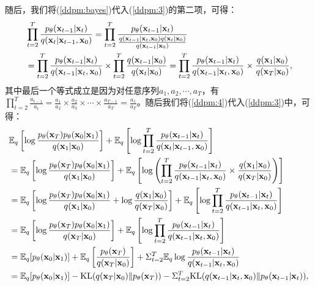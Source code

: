 \documentclass[11pt,a4paper,UTF8]{ctexart}
\begin{document}
\begin{appendices}
随后，我们将(\ref{ddpm:bayes})代入(\ref{ddpm:3})的第二项，可得：
\begin{align}
\begin{split}
    &\prod_{t=2}^T \frac{p_{\theta}(\mathbf{x}_{t-1}|\mathbf{x}_t)}{q(\mathbf{x}_t|\mathbf{x}_{t-1},\mathbf{x}_0)} = \prod_{t=2}^T \frac{p_{\theta}(\mathbf{x}_{t-1}|\mathbf{x}_t)}{\frac{q(\mathbf{x}_{t-1}|\mathbf{x}_t,\mathbf{x}_0)q(\mathbf{x}_t|\mathbf{x}_0)}{q(\mathbf{x}_{t-1}|\mathbf{x}_0)}} \\
    &= \prod_{t=2}^T \frac{p_{\theta}(\mathbf{x}_{t-1}|\mathbf{x}_t)}{q(\mathbf{x}_{t-1}|\mathbf{x}_t,\mathbf{x}_0)}  \times \prod_{t=2}^T \frac{q(\mathbf{x}_{t-1}|\mathbf{x}_0)}{q(\mathbf{x}_t|\mathbf{x}_0)} = \prod_{t=2}^T \frac{p_{\theta}(\mathbf{x}_{t-1}|\mathbf{x}_t)}{q(\mathbf{x}_{t-1}|\mathbf{x}_t,\mathbf{x}_0)}  \times \frac{q(\mathbf{x}_1|\mathbf{x}_0)}{q(\mathbf{x}_T|\mathbf{x}_0)},
\end{split}
\label{ddpm:4}
\end{align}
其中最后一个等式成立是因为对任意序列$a_1,a_2,\cdots,a_T$，有$\prod_{t=2}^T\frac{a_{t-1}}{a_t}=\frac{a_1}{a_2}\times\frac{a_2}{a_3}\times\cdots\times\frac{a_{T-1}}{a_T}=\frac{a_1}{a_T}$。随后我们将(\ref{ddpm:4})代入(\ref{ddpm:3})中，可得：
\begin{align}
\begin{split}
    & \mathbb{E}_q \left[\log\frac{p_{\theta}(\mathbf{x}_T)p_{\theta}(\mathbf{x}_0|\mathbf{x}_1)}{q(\mathbf{x}_1|\mathbf{x}_0)} \right] + \mathbb{E}_q \left[\log \prod_{t=2}^T \frac{p_{\theta}(\mathbf{x}_{t-1}|\mathbf{x}_t)}{q(\mathbf{x}_t|\mathbf{x}_{t-1},\mathbf{x}_0)} \right] \\
    &= \mathbb{E}_q \left[\log\frac{p_{\theta}(\mathbf{x}_T)p_{\theta}(\mathbf{x}_0|\mathbf{x}_1)}{q(\mathbf{x}_1|\mathbf{x}_0)} \right] + \mathbb{E}_q \left[\log \left(\prod_{t=2}^T \frac{p_{\theta}(\mathbf{x}_{t-1}|\mathbf{x}_t)}{q(\mathbf{x}_{t-1}|\mathbf{x}_t,\mathbf{x}_0)}  \times \frac{q(\mathbf{x}_1|\mathbf{x}_0)}{q(\mathbf{x}_T|\mathbf{x}_0)}\right) \right] \\
    &=\mathbb{E}_q \left[\log\frac{p_{\theta}(\mathbf{x}_T)p_{\theta}(\mathbf{x}_0|\mathbf{x}_1)}{q(\mathbf{x}_1|\mathbf{x}_0)} + \log \frac{q(\mathbf{x}_1|\mathbf{x}_0)}{q(\mathbf{x}_T|\mathbf{x}_0)} \right] + \mathbb{E}_q \left[\log \prod_{t=2}^T \frac{p_{\theta}(\mathbf{x}_{t-1}|\mathbf{x}_t)}{q(\mathbf{x}_{t-1}|\mathbf{x}_t,\mathbf{x}_0)}  \right] \\
    &= \mathbb{E}_q \left[\log\frac{p_{\theta}(\mathbf{x}_T)p_{\theta}(\mathbf{x}_0|\mathbf{x}_1)}{q(\mathbf{x}_T|\mathbf{x}_0)} \right] + \mathbb{E}_q \left[\log \prod_{t=2}^T \frac{p_{\theta}(\mathbf{x}_{t-1}|\mathbf{x}_t)}{q(\mathbf{x}_{t-1}|\mathbf{x}_t,\mathbf{x}_0)}  \right] \\
    &= \mathbb{E}_q [p_{\theta}(\mathbf{x}_0|\mathbf{x}_1)] + \mathbb{E}_q\left[\frac{p_{\theta}(\mathbf{x}_T)}{q(\mathbf{x}_T|\mathbf{x}_0)}\right] + \Sigma_{t=2}^T \mathbb{E}_q \log \frac{p_{\theta}(\mathbf{x}_{t-1}|\mathbf{x}_t)}{q(\mathbf{x}_{t-1}|\mathbf{x}_t,\mathbf{x}_0)} \\
    &= \mathbb{E}_q [p_{\theta}(\mathbf{x}_0|\mathbf{x}_1)] -\text{KL}(q(\mathbf{x}_T|\mathbf{x}_0)\| p_{\theta}(\mathbf{x}_T)) -  \Sigma_{t=2}^T \text{KL}(q(\mathbf{x}_{t-1}|\mathbf{x}_t,\mathbf{x}_0) \| p_{\theta}(\mathbf{x}_{t-1}|\mathbf{x}_t)),
\end{split}
\label{ddpm:5}
\end{align}

\end{appendices}
\end{document}
